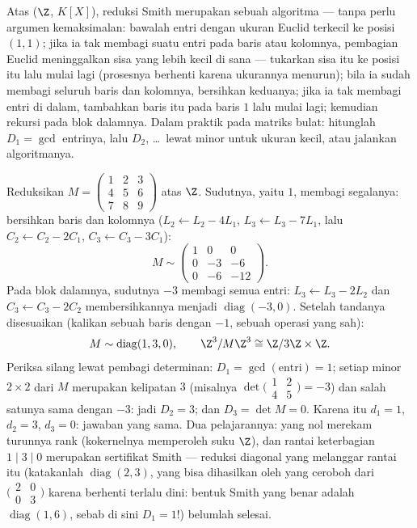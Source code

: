 \begin{method}\label{met:b3:modules:smith}
Atas  ($\Z$, $K[X]$), reduksi Smith merupakan sebuah
algoritma --- tanpa perlu argumen kemaksimalan: bawalah entri dengan
ukuran Euclid terkecil ke posisi $(1,1)$; jika ia tak membagi
suatu entri pada baris atau kolomnya, pembagian Euclid meninggalkan
sisa yang lebih kecil di sana --- tukarkan sisa itu ke posisi itu lalu mulai lagi
(prosesnya berhenti karena ukurannya menurun); bila ia sudah membagi seluruh baris dan
kolomnya, bersihkan keduanya; jika ia tak membagi entri di dalam, tambahkan baris
itu pada baris $1$ lalu mulai lagi; kemudian rekursi pada blok dalamnya. Dalam
praktik pada matriks bulat: hitunglah $D_1 = \gcd$ entrinya, lalu
$D_2$, \dots\ lewat minor untuk ukuran kecil, atau jalankan algoritmanya.
\end{method}

\begin{example}
\label{ex:b3:modules:smithworked}
Reduksikan $M = \begin{pmatrix} 1 & 2 & 3\\ 4 & 5 & 6\\ 7 & 8 & 9
\end{pmatrix}$ atas $\Z$. Sudutnya, yaitu $1$, membagi segalanya:
bersihkan baris dan kolomnya ($L_2 \leftarrow L_2 - 4L_1$, $L_3
\leftarrow L_3 - 7L_1$, lalu $C_2 \leftarrow C_2 - 2C_1$, $C_3
\leftarrow C_3 - 3C_1$):
\[
M \sim \begin{pmatrix} 1 & 0 & 0\\ 0 & -3 & -6\\ 0 & -6 & -12
\end{pmatrix} .
\]
Pada blok dalamnya, sudutnya $-3$ membagi semua entri: $L_3
\leftarrow L_3 - 2L_2$ dan $C_3 \leftarrow C_3 - 2C_2$ membersihkannya
menjadi $\operatorname{diag}(-3, 0)$. Setelah tandanya disesuaikan (kalikan sebuah
baris dengan $-1$, sebuah operasi yang sah):
\[
M \sim \operatorname{diag}(1, 3, 0),
\qquad
\Z^3/M\Z^3 \cong \Z/3\Z \times \Z .
\]
Periksa silang lewat pembagi determinan: $D_1 =
\gcd(\text{entri}) = 1$; setiap minor $2\times2$ dari $M$ merupakan
kelipatan $3$ (misalnya $\det\bigl(\begin{smallmatrix}1 & 2\\ 4
& 5\end{smallmatrix}\bigr) = -3$) dan salah satunya sama dengan $-3$: jadi $D_2 =
3$; dan $D_3 = \det M = 0$. Karena itu $d_1 = 1$, $d_2 = 3$, $d_3 = 0$:
jawaban yang sama. Dua pelajarannya:  yang nol merekam
turunnya rank (kokernelnya memperoleh suku  $\Z$), dan
rantai keterbagian $1 \mid 3 \mid 0$ merupakan sertifikat Smith
--- reduksi diagonal yang melanggar rantai itu (katakanlah
$\operatorname{diag}(2, 3)$, yang bisa dihasilkan oleh yang ceroboh
dari $\bigl(\begin{smallmatrix}2 & 0\\ 0 &
3\end{smallmatrix}\bigr)$ karena berhenti terlalu dini: bentuk Smith yang benar
adalah $\operatorname{diag}(1, 6)$, sebab di sini $D_1 = 1$!) belumlah
selesai.
\end{example}

